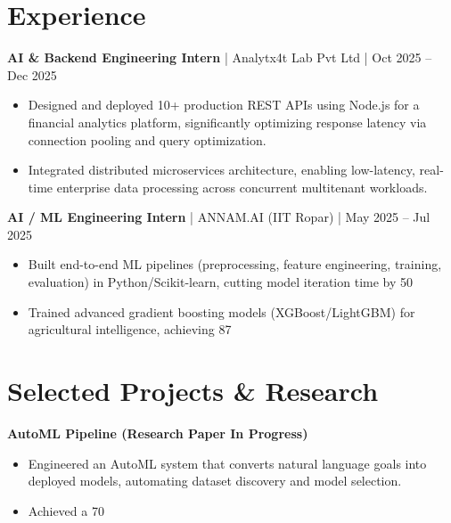 \documentclass[10pt, letterpaper]{article}
\begin{document}
\section*{Experience}
\textbf{AI & Backend Engineering Intern} | Analytx4t Lab Pvt Ltd | Oct 2025 – Dec 2025
\begin{itemize}[leftmargin=*, itemsep=2pt, parsep=0pt]
    \item Designed and deployed 10+ production REST APIs using Node.js for a financial analytics platform, significantly optimizing response latency via connection pooling and query optimization.
    \item Integrated distributed microservices architecture, enabling low-latency, real-time enterprise data processing across concurrent multitenant workloads.
\end{itemize}

\textbf{AI / ML Engineering Intern} | ANNAM.AI (IIT Ropar) | May 2025 – Jul 2025
\begin{itemize}[leftmargin=*, itemsep=2pt, parsep=0pt]
    \item Built end-to-end ML pipelines (preprocessing, feature engineering, training, evaluation) in Python/Scikit-learn, cutting model iteration time by 50%
    \item Trained advanced gradient boosting models (XGBoost/LightGBM) for agricultural intelligence, achieving 87%
\end{itemize}

\section*{Selected Projects & Research}
\textbf{AutoML Pipeline (Research Paper In Progress)}
\begin{itemize}[leftmargin=*, itemsep=2pt, parsep=0pt]
    \item Engineered an AutoML system that converts natural language goals into deployed models, automating dataset discovery and model selection.
    \item Achieved a 70%
\end{itemize}
\end{document}
